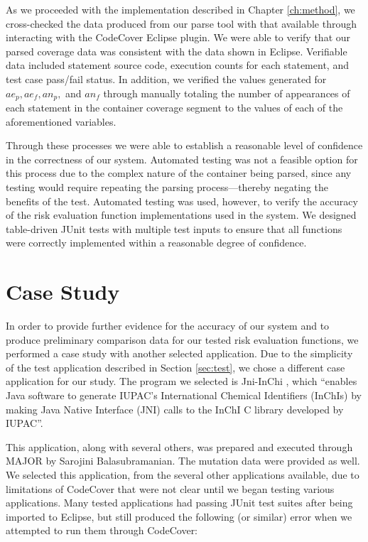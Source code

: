 As we proceeded with the implementation described in Chapter \ref{ch:method}, we cross-checked
the data produced from our parse tool with that available through interacting with the CodeCover
Eclipse plugin.  We were able to verify that our parsed coverage data was consistent
with the data shown in Eclipse.  Verifiable data included statement source code, execution 
counts for each statement, and test case pass/fail status.  In addition, we verified the values
generated for $ae_p, ae_f, an_p,$ and $an_f$ through manually totaling the number of appearances 
of each statement in the container coverage segment to the values of each of the aforementioned
variables.  

Through these processes we were able to establish a reasonable level of confidence
in the correctness of our system.  Automated testing was not a feasible option for this process
due to the complex nature of the container being parsed, since any testing would require 
repeating the parsing process---thereby negating the benefits of the test.  Automated testing
was used, however, to verify the accuracy of the risk evaluation function implementations
used in the system.  We designed table-driven JUnit tests with multiple test inputs to 
ensure that all functions were correctly implemented within a reasonable degree of confidence.

\section{Case Study}\label{sec:case}

In order to provide further evidence for the accuracy of our system and to produce preliminary 
comparison data for our tested risk evaluation functions, we performed a case study with another
selected application. Due to the simplicity of the test application described in Section \ref{sec:test}, 
we chose a different case application for our study.  The program we selected is Jni-InChi
\cite{jniinchi}, which ``enables Java software to generate IUPAC's International Chemical Identifiers 
(InChIs) by making Java Native Interface (JNI) calls to the InChI C library developed by IUPAC''.

This application, along with several others, was prepared and executed through MAJOR by Sarojini
Balasubramanian.  The mutation data were provided as well.  We selected this application, from the
several other applications available, due to limitations of CodeCover that were not clear until we
began testing various applications.  Many tested applications had passing JUnit test suites after
being imported to Eclipse, but still produced the following (or similar) error when we attempted
to run them through CodeCover:

